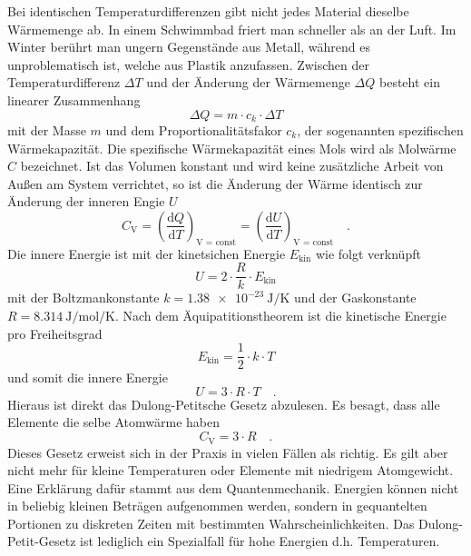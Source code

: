 Bei identischen Temperaturdifferenzen gibt nicht jedes Material dieselbe Wär\-me\-menge ab. In einem Schwimmbad friert man schneller als an der Luft. Im Winter berührt man ungern Gegenstände aus Metall, während es unproblematisch ist, welche aus Plastik anzufassen.
Zwischen der Temperaturdifferenz $\Delta T$ und der Änderung der Wärmemenge $\Delta Q$ besteht ein linearer Zusammenhang
\begin{equation}
  \Delta Q = m \cdot c_k \cdot \Delta T
\end{equation}
mit der Masse $m$ und dem Proportionalitätsfakor $c_k$, der sogenannten spezifischen Wärmekapazität.
Die spezifische Wärmekapazität eines Mols wird als Molwärme $C$ bezeichnet. Ist das Volumen konstant und wird keine zusätzliche Arbeit von Außen am System verrichtet, so ist die Änderung der Wärme identisch zur Änderung der inneren Engie $U$
\begin{equation}
  C_\text{V} = \left(\frac{\text{d} Q}{\text{d} T} \right)_\text{V = const}= \left(\frac{\text{d} U}{\text{d} T} \right)_\text{V = const} \quad.
\end{equation}
Die innere Energie ist mit der kinetsichen Energie $E_\text{kin}$ wie folgt verknüpft
\begin{equation}
  U = 2 \cdot \frac{R}{k} \cdot E_\text{kin}
\end{equation}
mit der Boltzmankonstante $k = \SI{1.38e-23}{\joule\per\kelvin}$ und der Gaskonstante $R = \SI{8.314}{\joule\per\mol\per\kelvin}$.
Nach dem Äquipatitionstheorem ist die kinetische Energie pro Freiheitsgrad
\begin{equation}
E_\text{kin}=\frac{1}{2}\cdot k \cdot T
\end{equation}
und somit die innere Energie
\begin{equation}
U = 3 \cdot R \cdot T \quad.
\end{equation}
Hieraus ist direkt das Dulong-Petitsche Gesetz abzulesen. Es besagt, dass alle Elemente die selbe Atomwärme haben
\begin{equation}\label{Dulon-Petit}
  C_\text{V} = 3 \cdot R \quad.
\end{equation}
Dieses Gesetz erweist sich in der Praxis in vielen Fällen als richtig. Es gilt aber nicht mehr für kleine Temperaturen oder Elemente mit niedrigem Atomgewicht. Eine Erklärung dafür stammt aus dem Quantenmechanik. Energien können nicht in beliebig kleinen Beträgen aufgenommen werden, sondern in gequantelten Portionen zu diskreten Zeiten mit bestimmten Wahrscheinlichkeiten. Das Dulong-Petit-Gesetz ist lediglich ein Spezialfall für hohe Energien d.h. Temperaturen. \\
